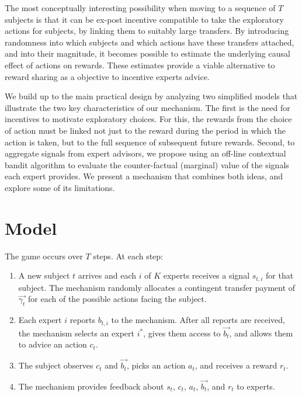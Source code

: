 The most conceptually interesting possibility when moving to a sequence of $T$ subjects is that it can be ex-post incentive compatible to take the exploratory actions for subjects, by linking them to suitably large transfers. By introducing randomness into which subjects and which actions have these transfers attached, and into their magnitude, it becomes possible to estimate the underlying causal effect of actions on rewards. 
These estimates provide a viable alternative to reward sharing as a objective to incentive experts advice. 





We build up to the main practical design by analyzing two simplified models that illustrate the two key characteristics of our mechanism. 
The first is the need for incentives to motivate exploratory choices.
For this, the rewards from the choice of action must be linked not just to the reward during the period in which the action is taken, but to the full sequence of subsequent future rewards.
Second, to aggregate signals from expert advisors, we propose using an off-line contextual bandit algorithm to evaluate the counter-factual (marginal) value of the signals each expert provides.
We present a mechanism that combines both ideas, and explore some of its limitations.


\section{Model}

The game occurs over $T$ steps. At each step: 

\begin{enumerate}
\item A new subject $t$ arrives and each $i$ of $K$ experts receives a signal $s_{t,i}$ for that subject. The mechanism  randomly allocates a contingent transfer payment of $\vec{\gamma_t}$ for each of the possible actions facing the subject. %
\item Each expert $i$ reports ${b}_{t,i}$ to the mechanism. After all reports are received, the mechanism selects an expert $i^{*}$, gives them access to $\vec{b_t}$, and allows them to advice an action $c_t$.
\item The subject observes $c_t$ and $\vec{b_t}$, picks an action $a_t$, and receives a reward $r_t$. %
\item The mechanism provides feedback about $s_t$, $c_t$, $a_t$, $\vec{b_t}$, and $r_t$ to experts. %
\end{enumerate}

